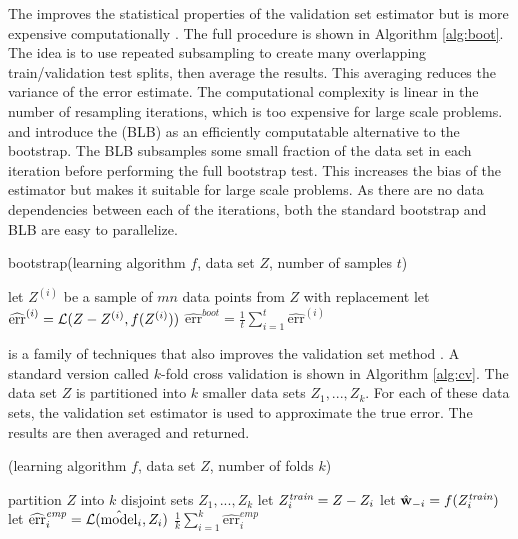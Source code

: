 \documentclass[thesis.tex]{subfiles}
\newcommand{\TO}{{\bfseries to}~}
\newcommand{\model}{\hat{\text{model}}}
\newcommand{\riskhat}{\widehat{\textrm{err}}}
\newcommand{\riskemp}{\widehat{\textrm{err}}^\textit{emp}}
\newcommand{\riskboot}{\widehat{\textrm{err}}^\textit{boot}}
\newcommand{\cv}{\mkprocedure{cv}}
\begin{document}
The  improves the statistical properties of the validation set estimator but is more expensive computationally \citep{efron1979bootstrap}.
The full procedure is shown in Algorithm \ref{alg:boot}.
The idea is to use repeated subsampling to create many overlapping train/validation test splits,
then average the results.
This averaging reduces the variance of the error estimate.
The computational complexity is linear in the number of resampling iterations,
which is too expensive for large scale problems.
\citet{kleiner2012big} and \citet{kleiner2014scalable} introduce the  (BLB) as an efficiently computatable alternative to the bootstrap.
The BLB subsamples some small fraction of the data set in each iteration before performing the full bootstrap test.
This increases the bias of the estimator but makes it suitable for large scale problems.
As there are no data dependencies between each of the iterations,
both the standard bootstrap and BLB are easy to parallelize.

\begin{algorithm}[t]
    \caption{bootstrap(learning algorithm $f$, data set $Z$, number of samples $t$)}
    \label{alg:boot}
    \vspace{0.1in}
    \begin{algorithmic}[1]
        \For {$i=1$ \TO $t$}
            \State let $Z^{(i)}$ be a sample of $mn$ data points from $Z$ with replacement
            \State let $\riskhat^{(i)} = \Loss(Z-Z^{(i)},f(Z^{(i)}))$
        \EndFor
        \State \Return $\riskboot = \frac 1 t \sum_{i=1}^t \riskhat^{(i)}$
    \end{algorithmic}
\end{algorithm}

 is a family of techniques that also improves the validation set method
\cite[see][for a survey]{arlot2010survey}.
A standard version called $k$-fold cross validation is shown in Algorithm \ref{alg:cv}.
The data set $Z$ is partitioned into $k$ smaller data sets $Z_1,...,Z_k$.
For each of these data sets, the validation set estimator is used to approximate the true error.
The results are then averaged and returned.

\begin{algorithm}[t]
    \caption{\cv(learning algorithm $f$, data set $Z$, number of folds $k$)}
    \label{alg:cv}
    \vspace{0.1in}
    \begin{algorithmic}[1]
        \State partition $Z$ into $k$ disjoint sets $Z_1,...,Z_k$
            \State let $Z^\textit{train}_i = Z-Z_i$
            \State let ${\hat{\mathbf w}}_{-i} = f(Z^\textit{train}_i)$ 
            \State let $\riskemp_i = \Loss(\model_i,Z_i)$
        \EndFor
        \State \Return $\frac 1 k \sum_{i=1}^k \riskemp_i$
    \end{algorithmic}
\end{algorithm}
\end{document}
